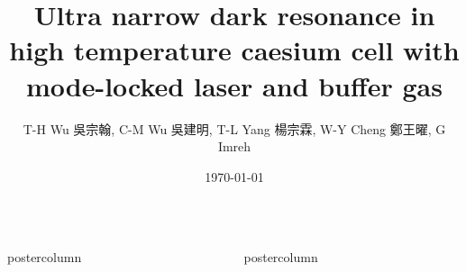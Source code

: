 \documentclass[CJKutf8,hyperref={pdfpagelabels=false,unicode}]{beamer}
\title{\huge Ultra narrow dark resonance in high temperature caesium cell with mode-locked laser and buffer gas}
\author{\begin{TChinese}T-H Wu 吳宗翰, C-M Wu 吳建明, T-L Yang 楊宗霖, W-Y Cheng 鄭王曜, G Imreh\end{TChinese}}
\institute[IAMS, Academia Sinica]{Institute of Atomic and Molecular Sciences, Academia Sinica, Taiwan}
\date{\today}
\newlength{\columnheight}
\begin{document}
\begin{frame}

  \begin{columns}
    \begin{column}{.49\textwidth}
      \begin{beamercolorbox}[center,wd=\textwidth]{postercolumn}
        \begin{minipage}[T]{.95\textwidth}
          \parbox[t][\columnheight]{\textwidth}{

            

            \vfill

            

            \vfill

            

          }
        \end{minipage}
      \end{beamercolorbox}
    \end{column}
    \begin{column}{.49\textwidth}
      \begin{beamercolorbox}[center,wd=\textwidth]{postercolumn}
        \begin{minipage}[T]{.95\textwidth}
          \parbox[t][\columnheight]{\textwidth}{

            
            \vfill

            
            \vfill

            
          }
        \end{minipage}
      \end{beamercolorbox}
    \end{column}
  \end{columns}
\end{frame}
\end{document}
